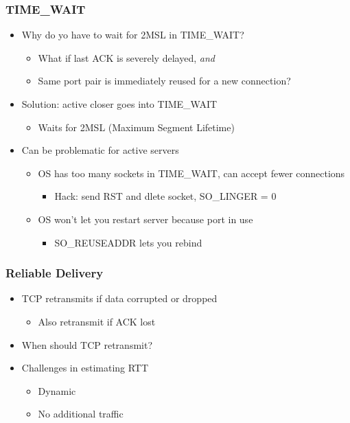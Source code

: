 \subsubsection{TIME\_WAIT}
\begin{itemize}[nosep]
    \item Why do yo have to wait for 2MSL in TIME\_WAIT?
          \begin{itemize}[nosep]
              \item What if last ACK is severely delayed, \emph{and}
              \item Same port pair is immediately reused for a new connection?
          \end{itemize}
    \item Solution: active closer goes into TIME\_WAIT
          \begin{itemize}[nosep]
              \item Waits for 2MSL (Maximum Segment Lifetime)
          \end{itemize}
    \item Can be problematic for active servers
          \begin{itemize}[nosep]
              \item OS has too many sockets in TIME\_WAIT, can accept fewer connections
                    \begin{itemize}[nosep]
                        \item Hack: send RST and dlete socket, SO\_LINGER = 0
                    \end{itemize}
              \item OS won't let you restart server because port in use
                    \begin{itemize}[nosep]
                        \item SO\_REUSEADDR lets you rebind
                    \end{itemize}
          \end{itemize}
\end{itemize}

\subsubsection{Reliable Delivery}
\begin{itemize}[nosep]
    \item TCP retransmits if data corrupted or dropped
          \begin{itemize}[nosep]
              \item Also retransmit if ACK lost
          \end{itemize}
    \item When should TCP retransmit?
    \item Challenges in estimating RTT
          \begin{itemize}[nosep]
              \item Dynamic
              \item No additional traffic
          \end{itemize}
\end{itemize}

